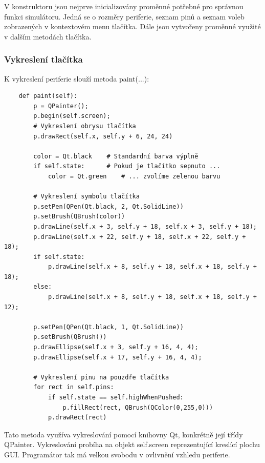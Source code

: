 V konstruktoru jsou nejprve inicializovány proměnné potřebné pro správnou funkci simulátoru. Jedná se o rozměry periferie, seznam pinů a seznam voleb zobrazených v kontextovém menu tlačítka. Dále jsou vytvořeny proměnné využité v dalším metodách tlačítka.

\subsubsection{Vykreslení tlačítka}

K vykreslení periferie slouží metoda paint(...):

\begin{lstlisting}
	def paint(self):
		p = QPainter();
		p.begin(self.screen);
		# Vykreslení obrysu tlačítka
		p.drawRect(self.x, self.y + 6, 24, 24)

		color = Qt.black	# Standardní barva výplně
		if self.state:		# Pokud je tlačítko sepnuto ...
			color = Qt.green	# ... zvolíme zelenou barvu

		# Vykreslení symbolu tlačítka
		p.setPen(QPen(Qt.black, 2, Qt.SolidLine))
		p.setBrush(QBrush(color))
		p.drawLine(self.x + 3, self.y + 18, self.x + 3, self.y + 18);
		p.drawLine(self.x + 22, self.y + 18, self.x + 22, self.y + 18);
		if self.state:
			p.drawLine(self.x + 8, self.y + 18, self.x + 18, self.y + 18);
		else:
			p.drawLine(self.x + 8, self.y + 18, self.x + 18, self.y + 12);

		p.setPen(QPen(Qt.black, 1, Qt.SolidLine))
		p.setBrush(QBrush())
		p.drawEllipse(self.x + 3, self.y + 16, 4, 4);
		p.drawEllipse(self.x + 17, self.y + 16, 4, 4);

		# Vykreslení pinu na pouzdře tlačítka
		for rect in self.pins:
			if self.state == self.highWhenPushed:
				p.fillRect(rect, QBrush(QColor(0,255,0)))
			p.drawRect(rect)
\end{lstlisting}

Tato metoda využíva vykreslování pomocí knihovny Qt, konkrétně její třídy QPainter. Vykreslování probíha na objekt self.screen reprezentující kreslící plochu GUI. Programátor tak má velkou svobodu v ovlivnění vzhledu periferie.

